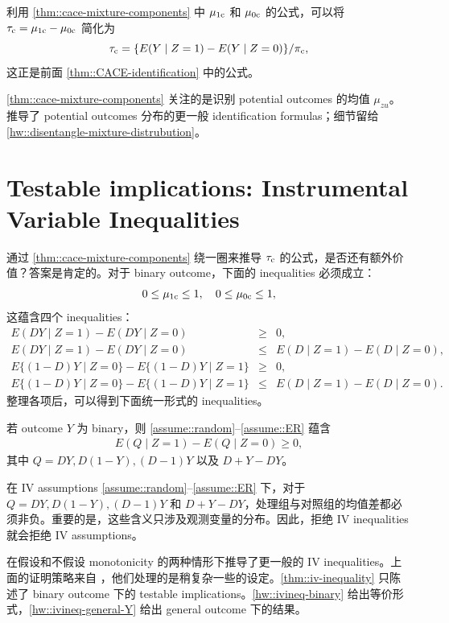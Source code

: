 利用 \cref{thm::cace-mixture-components} 中 $\mu_{1\textup{c}} $ 和 $\mu_{0\textup{c}} $ 的公式，可以将 $\tau_{\textup{c}} = \mu_{1\textup{c}}  - \mu_{0\textup{c}}  $ 简化为
$$
\tau_{\textup{c}} =  \{  E(Y\mid Z=1) - E(Y\mid Z=0) \}/\pi_{\textup{c}} ,
$$
这正是前面 \cref{thm::CACE-identification} 中的公式。

\cref{thm::cace-mixture-components} 关注的是识别 potential outcomes 的均值 $\mu_{zu} $。\citet{imbens1997estimating} 推导了 potential outcomes 分布的更一般 identification formulas；细节留给 \cref{hw::disentangle-mixture-distrubution}。



\section{Testable implications: Instrumental Variable Inequalities}


通过 \cref{thm::cace-mixture-components} 绕一圈来推导 $\tau_{\textup{c}}$ 的公式，是否还有额外价值？答案是肯定的。对于 binary outcome，下面的 inequalities 必须成立：
$$
0\leq \mu_{1\textup{c}} \leq 1, \quad 
0\leq \mu_{0\textup{c}} \leq 1, 
$$
这蕴含四个 inequalities：
\begin{eqnarray*}
E(DY\mid Z=1 )  -  E(DY\mid Z=0) &\geq & 0 ,\\
E(DY\mid Z=1 )  -  E(DY\mid Z=0) &\leq  & E(D\mid Z=1) - E(D\mid Z=0)  ,\\ 
E\{ (1-D)Y\mid Z=0 \}  -  E\{(1-D)Y\mid Z=1 \}   &\geq & 0,\\
E\{ (1-D)Y\mid Z=0 \}  -  E\{(1-D)Y\mid Z=1 \}  &\leq & E(D\mid Z=1) - E(D\mid Z=0) . 
\end{eqnarray*}
整理各项后，可以得到下面统一形式的 inequalities。


\begin{theorem}\label{thm::iv-inequality}
若 outcome $Y$ 为 binary，则 \cref{assume::random}--\cref{assume::ER} 蕴含
\begin{eqnarray}\label{eq::iv-inequalities}
E(Q\mid Z=1) - E(Q\mid Z=0) \geq 0,  
\end{eqnarray}
其中 $Q = DY, D(1-Y), (D - 1)Y$ 以及 $D+Y-DY$。
\end{theorem}


在 IV assumptions \cref{assume::random}--\cref{assume::ER} 下，对于 $Q = DY, D(1-Y), (D - 1)Y$ 和 $D+Y-DY$，处理组与对照组的均值差都必须非负。重要的是，这些含义只涉及观测变量的分布。因此，拒绝 IV inequalities 就会拒绝 IV assumptions。


\citet{balke1997bounds} 在假设和不假设 monotonicity 的两种情形下推导了更一般的 IV inequalities。上面的证明策略来自 \citet{jiang2020measurement}，他们处理的是稍复杂一些的设定。\cref{thm::iv-inequality} 只陈述了 binary outcome 下的 testable implications。\cref{hw::ivineq-binary} 给出等价形式，\cref{hw::ivineq-general-Y} 给出 general outcome 下的结果。



